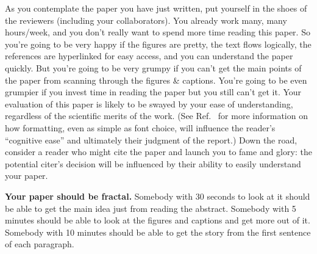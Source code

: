  As you contemplate the paper you have just written, put yourself in the shoes of the reviewers (including your collaborators). You already work many, many hours/week, and you don't really want to spend more time reading this paper. So you're going to be very happy if the figures are pretty, the text flows logically, the references are hyperlinked for easy access, and you can understand the paper quickly. But you're going to be very grumpy if you can't get the main points of the paper from scanning through the figures \& captions. You're going to be even grumpier if you invest time in reading the paper but you still can't get it. Your evaluation of this paper is likely to be swayed by your ease of understanding, regardless of the scientific merits of the work. (See Ref.\  for more information on how formatting, even as simple as font choice, will influence the reader's ``cognitive ease'' and ultimately their judgment of the report.) Down the road, consider a reader who might cite the paper and launch you to fame and glory: the potential citer's decision will be influenced by their ability to easily understand your paper.

 \textbf{Your paper should be fractal.} Somebody with 30 seconds to look at it should be able to get the main idea just from reading the abstract. Somebody with 5 minutes should be able to look at the figures and captions and get more out of it. Somebody with 10 minutes should be able to get the story from the first sentence of each paragraph.

